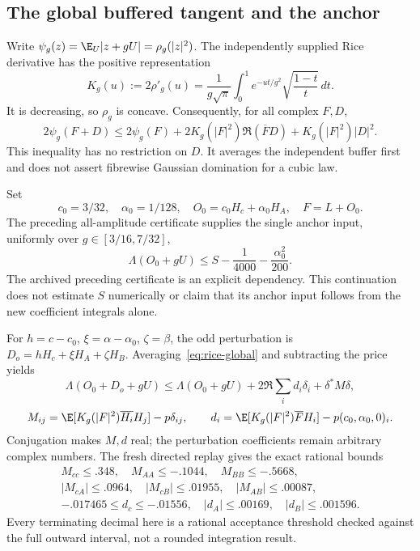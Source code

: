 \subsection{The global buffered tangent and the anchor}
Write $\psi_g(z)=\E_U|z+gU|=\rho_g(|z|^2)$. The independently supplied Rice derivative has the positive representation
\[
 K_g(u):=2\rho'_g(u)=\frac1{g\sqrt\pi}\int_0^1
 e^{-ut/g^2}\sqrt{\frac{1-t}{t}}\,dt.
\]
It is decreasing, so $\rho_g$ is concave. Consequently, for all complex $F,D$,
\begin{equation}
 2\psi_g(F+D)\le2\psi_g(F)+2K_g(|F|^2)\Re(\overline FD)+K_g(|F|^2)|D|^2.
 \label{eq:rice-global}
\end{equation}
This inequality has no restriction on $D$. It averages the independent buffer first and does not assert fibrewise Gaussian domination for a cubic law.

Set
\[
 c_0=3/32,\quad \alpha_0=1/128,\quad O_0=c_0H_c+\alpha_0H_A,\quad F=L+O_0.
\]
The preceding all-amplitude certificate supplies the single anchor input, uniformly over $g\in[3/16,7/32]$,
\begin{equation}
 \Lambda(O_0+gU)\le S-\frac1{4000}-\frac{\alpha_0^2}{200}.
 \label{eq:ch42-anchor}
\end{equation}
The archived preceding certificate is an explicit dependency. This continuation does not estimate $S$ numerically or claim that its anchor input follows from the new coefficient integrals alone.

For $h=c-c_0$, $\xi=\alpha-\alpha_0$, $\zeta=\beta$, the odd perturbation is $D_o=hH_c+\xi H_A+\zeta H_B$. Averaging~\eqref{eq:rice-global} and subtracting the price yields
\[
 \Lambda(O_0+D_o+gU)\le\Lambda(O_0+gU)+2\Re\sum_i d_i\delta_i+\delta^*M\delta,
\]
\[
 M_{ij}=\E[K_g(|F|^2)\overline{H_i}H_j]-p\delta_{ij},\qquad
 d_i=\E[K_g(|F|^2)\overline FH_i]-p(c_0,\alpha_0,0)_i.
\]
Conjugation makes $M,d$ real; the perturbation coefficients remain arbitrary complex numbers. The fresh directed replay gives the exact rational bounds
\begin{gather*}
 M_{cc}\le.348,\quad M_{AA}\le-.1044,\quad M_{BB}\le-.5668,\\
 |M_{cA}|\le.0964,\quad |M_{cB}|\le.01955,\quad |M_{AB}|\le.00087,\\
 -.017465\le d_c\le-.01556,\quad |d_A|\le.00169,\quad |d_B|\le.001596.
\end{gather*}
Every terminating decimal here is a rational acceptance threshold checked against the full outward interval, not a rounded integration result.

